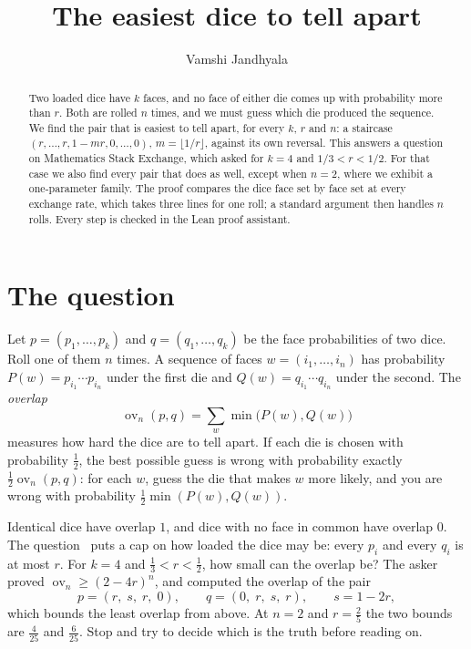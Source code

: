 \documentclass[11pt]{article}
\title{The easiest dice to tell apart}
\author{Vamshi Jandhyala}
\date{}
\theoremstyle{remark}
\newcommand{\ov}{\operatorname{ov}}
\begin{document}
\maketitle
\vspace{-2em}

\begin{abstract}
Two loaded dice have $k$ faces, and no face of either die comes up with probability more than $r$. Both
are rolled $n$ times, and we must guess which die produced the sequence. We find the pair that is easiest to
tell apart, for every $k$, $r$ and $n$: a staircase $(r,\dots,r,1-mr,0,\dots,0)$, $m=\lfloor 1/r\rfloor$,
against its own reversal. This answers a question on Mathematics Stack Exchange, which asked for $k=4$ and
$1/3<r<1/2$. For that case we also find every pair that does as well, except when $n=2$, where we exhibit a
one-parameter family. The proof compares the dice face set by face set at every exchange rate, which
takes three lines for one roll; a standard argument then handles $n$ rolls. Every step is checked in the Lean
proof assistant.
\end{abstract}

\section{The question}

Let $p=(p_1,\dots,p_k)$ and $q=(q_1,\dots,q_k)$ be the face probabilities of two dice. Roll one of them $n$
times. A sequence of faces $w=(i_1,\dots,i_n)$ has probability $P(w)=p_{i_1}\cdots p_{i_n}$ under the first
die and $Q(w)=q_{i_1}\cdots q_{i_n}$ under the second. The \emph{overlap}
\[
\ov_n(p,q)=\sum_{w}\min\bigl(P(w),Q(w)\bigr)
\]
measures how hard the dice are to tell apart. If each die is chosen with probability $\frac12$, the best
possible guess is wrong with probability exactly $\frac12\ov_n(p,q)$: for each $w$, guess the die that makes
$w$ more likely, and you are wrong with probability $\frac12\min(P(w),Q(w))$.

Identical dice have overlap $1$, and dice with no face in common have overlap $0$. The question~\cite{MSE}
puts a cap on how loaded the dice may be: every $p_i$ and every $q_i$ is at most $r$. For $k=4$ and
$\frac13<r<\frac12$, how small can the overlap be? The asker proved $\ov_n\ge(2-4r)^n$, and computed the overlap of the pair
\[
p=(r,\;s,\;r,\;0),\qquad q=(0,\;r,\;s,\;r),\qquad s=1-2r,
\]
which bounds the least overlap from above. At $n=2$ and $r=\frac25$ the two bounds are $\frac4{25}$ and $\frac6{25}$. Stop and
try to decide which is the truth before reading on.
\end{document}
